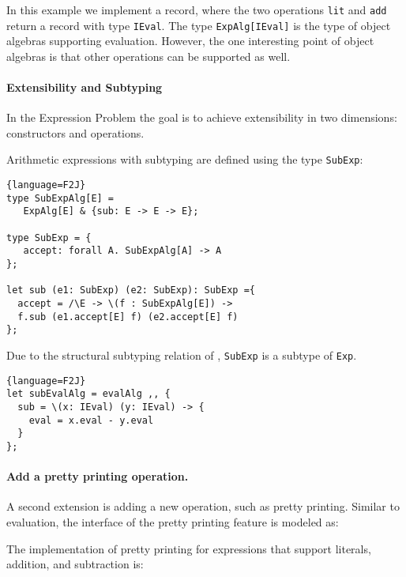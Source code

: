 In this example we implement a record, where the two operations 
\lstinline{lit} and \lstinline{add} return a record with type \lstinline{IEval}.
The type \lstinline$ExpAlg[IEval]$ is the type of object algebras
supporting evaluation. However, the one interesting point
of object algebras is that other operations can be supported as
well. 

\paragraph{Extensibility and Subtyping} In the Expression Problem the goal is to
achieve extensibility in two dimensions: constructors and operations. 

Arithmetic expressions with subtyping are defined using the type \lstinline{SubExp}:

\begin{lstlisting}{language=F2J}
type SubExpAlg[E] = 
   ExpAlg[E] & {sub: E -> E -> E};

type SubExp = {
   accept: forall A. SubExpAlg[A] -> A
};

let sub (e1: SubExp) (e2: SubExp): SubExp ={ 
  accept = /\E -> \(f : SubExpAlg[E]) ->
  f.sub (e1.accept[E] f) (e2.accept[E] f) 
};
\end{lstlisting}


Due to the structural subtyping relation of \name, \lstinline{SubExp}
is a subtype of \lstinline{Exp}.

\begin{lstlisting}{language=F2J}
let subEvalAlg = evalAlg ,, {
  sub = \(x: IEval) (y: IEval) -> { 
    eval = x.eval - y.eval 
  }
};
\end{lstlisting}


\paragraph{Add a pretty printing operation.}
A second extension is adding a new operation, such as pretty printing. 
Similar to evaluation, the interface of the pretty printing feature
is modeled as:
\begin{comment}
  \begin{lstlisting}{language=F2J}
    type IPrint = {print : String};
  \end{lstlisting}
\end{comment}
The implementation of pretty printing for expressions that support literals,
addition, and subtraction is:
\begin{comment}
  \begin{lstlisting}{language=F2J}
    let printAlg : SubExpAlg[IPrint] = {
      lit = \(x: Int) -> {print = x.toString()},
      add = \(x: IPrint) (y: IPrint) -> {
        print = x.print ++ " + " ++ y.print
      },
      sub = \(x: IPrint) (y: IPrint) -> {
        print = x.print ++ " - " ++ y.print
      }
    };
  \end{lstlisting}
\end{comment}

